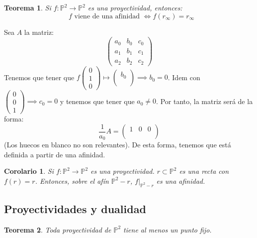 \documentclass[11pt, a4paper]{article}
\makeatletter
\newif\IfInSansMode
\let\oldsf\sffamily
\renewcommand*{\sffamily}{\oldsf\mathversion{sans}\InSansModetrue}
\let\oldnorm\normalfont
\renewcommand*{\normalfont}{\oldnorm\InSansModefalse\mathversion{normal}}
\renewenvironment{proof}[1][\proofname] {\vspace{-15pt}\par\pushQED{\qed}\normalfont\topsep6\p@\@plus6\p@\relax\trivlist\item[\hskip\labelsep\it#1\@addpunct{.}]\ignorespaces}{\popQED\endtrivlist\@endpefalse}
\renewenvironment{proof}[1][\proofname] {\par\pushQED{\qed}\normalfont\topsep6\p@\@plus6\p@\relax\trivlist\item[\hskip\labelsep\itshape\sffamily#1\@addpunct{.}]\ignorespaces}{\popQED\endtrivlist\@endpefalse}
\theoremstyle{theorem-style}
\newtheorem{nth}{Teorema}[section]
\newtheorem{ncor}{Corolario}[section]
\theoremstyle{definition-style}
\theoremstyle{remark-style}
\theoremstyle{example-style}
\makeatother
\begin{document}
\begin{nth}
	Si $f: \mathbb P^2 \to \mathbb P^2$ es una proyectividad, entonces:
	\[
	\text{ $f$ viene de una afinidad } \iff f(r_\infty) = r_\infty
	\]
\end{nth}
\begin{proof}
	Sea $A$ la matriz:
	\[
	\begin{pmatrix}
 a_0& b_0 & c_0 \\
 a_1 & b_1 & c_1\\
 a_2 & b_2 & c_2
\end{pmatrix} 
	\]
	Tenemos que tener que $f\begin{pmatrix}
0\\
1\\
0
\end{pmatrix} \mapsto \begin{pmatrix}
b_0\\
\\

\end{pmatrix} \implies b_0 = 0 $. Idem con $\begin{pmatrix}
0\\
0\\
1
\end{pmatrix} \implies c_0 = 0 $ y tenemos que tener que $a_0 \ne 0$. Por tanto, la matriz será de la forma:
\[
\dfrac{1}{a_0} A = \begin{pmatrix}
 1& 0 & 0 \\
  &  & \\
  & & 
\end{pmatrix} 
\]
(Los huecos en blanco no son relevantes). De esta forma, tenemos que está definida a partir de una afinidad.
\end{proof}

\begin{ncor}
	Si $f: \mathbb P^2 \to \mathbb P^2$ es una proyectividad. $r\subset \mathbb P^2$ es una recta con $f(r) = r$.
	Entonces, sobre el afín $\mathbb P^2 -r$, $f|_{\mathbb P^2 -r}$ es una afinidad.
\end{ncor}

\subsection{Proyectividades y dualidad}

\begin{nth}
	Toda proyectividad de $\mathbb P^2$ tiene al menos un punto fijo.
\end{nth}
\end{document}
